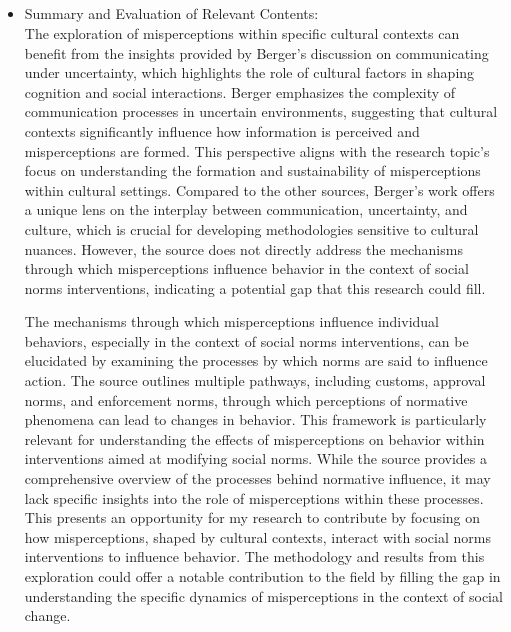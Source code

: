 \documentclass{article}
\begin{document}
\subsection{}
\begin{itemize}
    \item Summary and Evaluation of Relevant Contents:\\
The exploration of misperceptions within specific cultural contexts can benefit from the insights provided by Berger's discussion on communicating under uncertainty, which highlights the role of cultural factors in shaping cognition and social interactions. Berger emphasizes the complexity of communication processes in uncertain environments, suggesting that cultural contexts significantly influence how information is perceived and misperceptions are formed. This perspective aligns with the research topic's focus on understanding the formation and sustainability of misperceptions within cultural settings. Compared to the other sources, Berger's work offers a unique lens on the interplay between communication, uncertainty, and culture, which is crucial for developing methodologies sensitive to cultural nuances. However, the source does not directly address the mechanisms through which misperceptions influence behavior in the context of social norms interventions, indicating a potential gap that this research could fill.

The mechanisms through which misperceptions influence individual behaviors, especially in the context of social norms interventions, can be elucidated by examining the processes by which norms are said to influence action. The source outlines multiple pathways, including customs, approval norms, and enforcement norms, through which perceptions of normative phenomena can lead to changes in behavior. This framework is particularly relevant for understanding the effects of misperceptions on behavior within interventions aimed at modifying social norms. While the source provides a comprehensive overview of the processes behind normative influence, it may lack specific insights into the role of misperceptions within these processes. This presents an opportunity for my research to contribute by focusing on how misperceptions, shaped by cultural contexts, interact with social norms interventions to influence behavior. The methodology and results from this exploration could offer a notable contribution to the field by filling the gap in understanding the specific dynamics of misperceptions in the context of social change.
\end{itemize}
\end{document}
